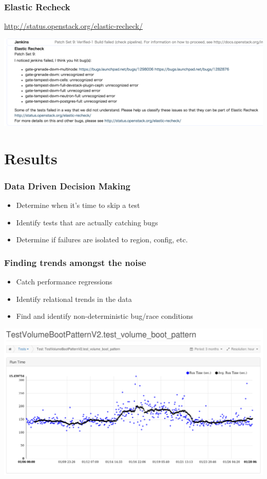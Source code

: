 \documentclass[aspectratio=169,11pt,hyperref={colorlinks=true}]{beamer}
\begin{document}
\begin{frame}
    \frametitle{Elastic Recheck}
    \href{http://status.openstack.org/elastic-recheck/}{http://status.openstack.org/elastic-recheck/}
  \begin{center}
    \includegraphics[width=.73\textwidth]{elastic-recheck-sample.png}
  \end{center}
\end{frame}


\section{Results}
\begin{frame}
    \frametitle{Data Driven Decision Making}
    \begin{itemize}
        \item Determine when it's time to skip a test
        \item Identify tests that are actually catching bugs
        \item Determine if failures are isolated to region, config, etc.
    \end{itemize}
\end{frame}

\begin{frame}
    \frametitle{Finding trends amongst the noise}
    \begin{itemize}
        \item Catch performance regressions
        \item Identify relational trends in the data
        \item Find and identify non-deterministic bug/race conditions
    \end{itemize}
    \begin{center}
        \includegraphics[height=.7\textheight]{Performance-Issue-o-h.png}
    \end{center}
\end{frame}
\end{document}
